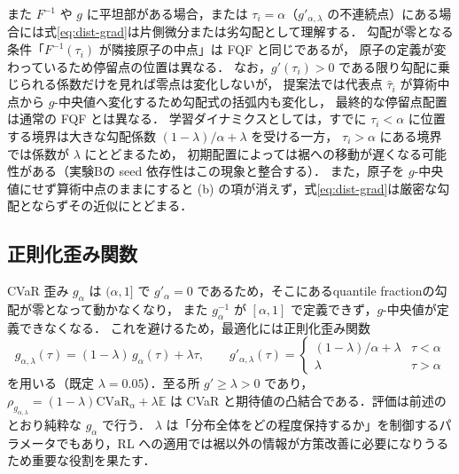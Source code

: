 \documentclass[a4paper,10pt]{jsarticle}
\theoremstyle{definition}
\newcommand{\CVaR}{\mathrm{CVaR}}
\newcommand{\Finv}{F^{-1}}
\newcommand{\E}{\mathbb{E}}
\begin{document}
また $\Finv$ や $g$ に平坦部がある場合，または $\tau_i=\alpha$（$g'_{\alpha,\lambda}$ の不連続点）にある場合には式\eqref{eq:dist-grad}は片側微分または劣勾配として理解する．
勾配が零となる条件「$\Finv(\tau_i)$ が隣接原子の中点」は FQF と同じであるが，
原子の定義が変わっているため停留点の位置は異なる．
なお，$g'(\tau_i)>0$ である限り勾配に乗じられる係数だけを見れば零点は変化しないが，
提案法では代表点 $\hat\tau_i$ が算術中点から $g$-中央値へ変化するため勾配式の括弧内も変化し，
最終的な停留点配置は通常の FQF とは異なる．
学習ダイナミクスとしては，すでに $\tau_i<\alpha$ に位置する境界は大きな勾配係数 $(1-\lambda)/\alpha+\lambda$ を受ける一方，
$\tau_i>\alpha$ にある境界では係数が $\lambda$ にとどまるため，
初期配置によっては裾への移動が遅くなる可能性がある（実験Bの seed 依存性はこの現象と整合する）．
また，原子を $g$-中央値にせず算術中点のままにすると (b) の項が消えず，式\eqref{eq:dist-grad}は厳密な勾配とならずその近似にとどまる．

\subsection{正則化歪み関数}
CVaR 歪み $g_\alpha$ は $(\alpha,1]$ で $g'_\alpha=0$ であるため，そこにあるquantile fractionの勾配が零となって動かなくなり，
また $g_\alpha^{-1}$ が $[\alpha,1]$ で定義できず，$g$-中央値が定義できなくなる．
これを避けるため，最適化には正則化歪み関数
\begin{equation}
  g_{\alpha,\lambda}(\tau)=(1-\lambda)\,g_\alpha(\tau)+\lambda\tau,\qquad
  g'_{\alpha,\lambda}(\tau)=\begin{cases}(1-\lambda)/\alpha+\lambda & \tau<\alpha\\ \lambda & \tau>\alpha\end{cases}
  \label{eq:g-reg}
\end{equation}
を用いる（既定 $\lambda=0.05$）．至る所 $g'\ge\lambda>0$ であり，$\rho_{g_{\alpha,\lambda}}=(1-\lambda)\CVaR_\alpha+\lambda\E$ は
CVaR と期待値の凸結合である．評価は前述のとおり純粋な $g_\alpha$ で行う．
$\lambda$ は「分布全体をどの程度保持するか」を制御するパラメータでもあり，RL への適用では裾以外の情報が方策改善に必要になりうるため重要な役割を果たす．
\end{document}
